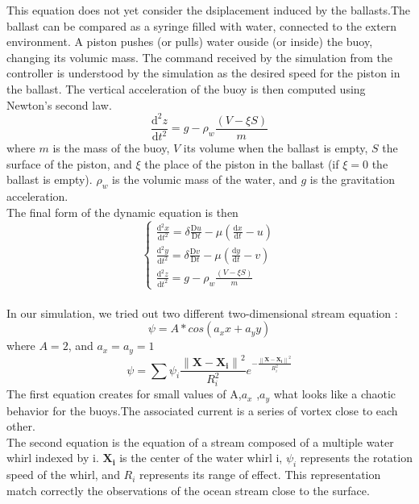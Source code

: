 \documentclass[a4paper]{report}
\begin{document}
This equation does not yet consider the dsiplacement induced by the ballasts.The ballast can be compared as a syringe filled with water, connected to the extern environment. A piston pushes (or pulls) water ouside (or inside) the buoy, changing its volumic mass.
The command received by the simulation from the controller is understood by the simulation as the desired speed for the piston in the ballast.
The vertical acceleration of the buoy is then computed using Newton's second law.\\
\begin{equation}
\frac{\mathrm{d^2} z}{\mathrm{d} t^2}= g-\rho_w \frac {\left ( V-\xi S \right )}{m}
\end{equation}
where $m$ is the mass of the buoy, $V$ its volume when the ballast is empty, $S$ the surface of the piston, and $\xi$ the place of the piston in the ballast (if $\xi = 0$ the ballast is empty). $\rho_w$ is the volumic mass of the water, and $g$ is the gravitation acceleration.\\
The final form of the dynamic equation is then 
\begin{equation}
\left\{\begin{matrix}
\frac{\mathrm{d^2} x}{\mathrm{d} t^2}= \delta \frac{\mathrm{D} u}{\mathrm{D} t} -\mu (\frac{\mathrm{d} x }{\mathrm{d} t}-u)\\ 
\frac{\mathrm{d^2} y}{\mathrm{d} t^2}= \delta \frac{\mathrm{D} v}{\mathrm{D} t} -\mu (\frac{\mathrm{d} y}{\mathrm{d} t}-v)\\
\frac{\mathrm{d^2} z}{\mathrm{d} t^2}= g-\rho_w \frac {\left ( V-\xi S \right )}{m}
\end{matrix}\right.
\end{equation}
\\

In our simulation, we tried out two different two-dimensional stream equation :
\begin{equation}
\psi = A*cos(a_x x+a_y y)
\end{equation}
where $A=2$, and $a_x = a_y = 1$
\begin{equation}
\psi = \sum \psi _i \frac{\left \| \mathbf{X}-\mathbf{X_i} \right \|^2 }{R_i ^2}e^{ -\frac{\left \| \mathbf{X}-\mathbf{X_i} \right \|^2 }{R_i ^2}}
\end{equation}
The first equation creates for small values of A,$a_x$ ,$a_y$ what looks like a chaotic behavior for the buoys.The associated current is a series of vortex close to each other.\\

The second equation is the equation of a stream composed of a multiple water whirl indexed by i. $\mathbf{X_i}$ is the center of the water whirl i, $\psi _i$ represents the rotation speed of the whirl, and $R_i$ represents its range of effect. This representation match correctly the observations of the ocean stream close to the surface. \\
\end{document}
